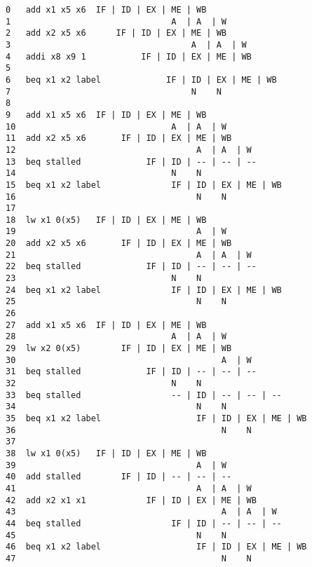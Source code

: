 \documentclass[varwidth, convert]{standalone}
\begin{document}
  \begin{BVerbatim}[]
0   add x1 x5 x6  IF | ID | EX | ME | WB
1                                A  | A  | W
2   add x2 x5 x6      IF | ID | EX | ME | WB
3                                    A  | A  | W
4   addi x8 x9 1           IF | ID | EX | ME | WB
5
6   beq x1 x2 label             IF | ID | EX | ME | WB
7                                    N    N
8
9   add x1 x5 x6  IF | ID | EX | ME | WB
10                               A  | A  | W
11  add x2 x5 x6       IF | ID | EX | ME | WB
12                                    A  | A  | W
13  beq stalled             IF | ID | -- | -- | --
14                               N    N
15  beq x1 x2 label              IF | ID | EX | ME | WB
16                                    N    N
17
18  lw x1 0(x5)   IF | ID | EX | ME | WB
19                                    A  | W
20  add x2 x5 x6       IF | ID | EX | ME | WB
21                                    A  | A  | W
22  beq stalled             IF | ID | -- | -- | --
23                               N    N
24  beq x1 x2 label              IF | ID | EX | ME | WB
25                                    N    N
26
27  add x1 x5 x6  IF | ID | EX | ME | WB
28                               A  | A  | W
29  lw x2 0(x5)        IF | ID | EX | ME | WB
30                                         A  | W
31  beq stalled             IF | ID | -- | -- | --
32                               N    N
33  beq stalled                  -- | ID | -- | -- | --
34                                    N    N
35  beq x1 x2 label                   IF | ID | EX | ME | WB
36                                         N    N
37
38  lw x1 0(x5)   IF | ID | EX | ME | WB
39                                    A  | W
40  add stalled        IF | ID | -- | -- | --
41                                    A  | A  | W
42  add x2 x1 x1            IF | ID | EX | ME | WB
43                                         A  | A  | W
44  beq stalled                  IF | ID | -- | -- | --
45                                    N    N
46  beq x1 x2 label                   IF | ID | EX | ME | WB
47                                         N    N
  \end{BVerbatim}
\end{document}
